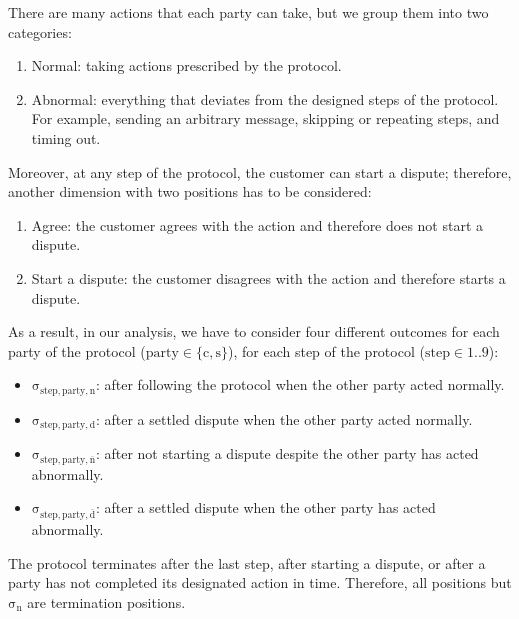 There are many actions that each party can take, but we group them into two categories:

\begin{enumerate}
\def\labelenumi{\arabic{enumi}.}

\item Normal: taking actions prescribed by the protocol.
\item Abnormal: everything that deviates from the designed steps of the protocol. For example, sending an arbitrary message, skipping or repeating steps, and timing out.
\end{enumerate}

Moreover, at any step of the protocol, the customer can start a dispute; therefore, another dimension with two positions has to be considered:

\begin{enumerate}
\def\labelenumi{\arabic{enumi}.}

\item Agree: the customer agrees with the action and therefore does not start a dispute.
\item Start a dispute: the customer disagrees with the action and therefore starts a dispute.
\end{enumerate}

As a result, in our analysis, we have to consider four different outcomes for each party of the protocol ($\mathrm{party \in \{c, s}\}$), for each step of the protocol ($\mathrm{step \in 1..9}$):

\begin{itemize}

\item
  $\mathrm{\sigma_{step,party,n}}$: after following the protocol when the other party acted normally.
\item
  $\mathrm{\sigma_{step,party,d}}$: after a settled dispute when the other party acted normally.
\item
  $\mathrm{\sigma_{step,party,\overline{n}}}$: after not starting a dispute despite the other party has acted abnormally.
\item
  $\mathrm{\sigma_{step,party,\overline{d}}}$: after a settled dispute when the other party has acted abnormally.
\end{itemize}



The protocol terminates after the last step, after starting a dispute, or after a party has not completed its designated action in time. Therefore, all positions but $\mathrm{\sigma_n}$ are termination positions.

